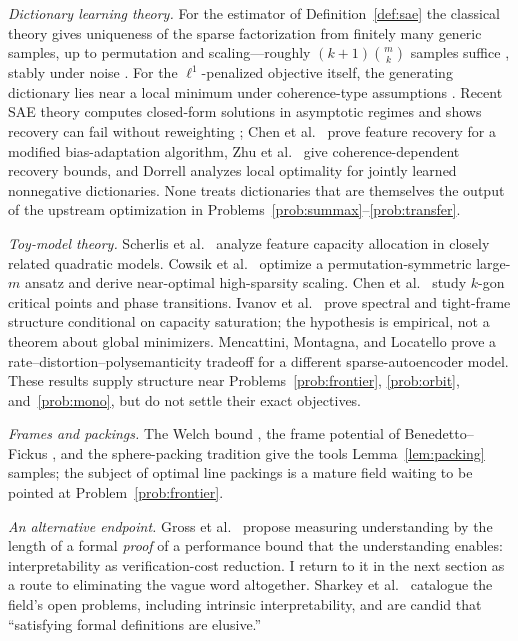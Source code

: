 \documentclass[11pt]{amsart}
\theoremstyle{plain}
\theoremstyle{definition}
\begin{document}
\emph{Dictionary learning theory.} For the estimator of Definition~\ref{def:sae} the classical theory gives uniqueness of the sparse factorization from finitely many generic samples, up to permutation and scaling---roughly $(k+1)\binom{m}{k}$ samples suffice \cite{aharon2006,hillar2015}, stably under noise \cite{garfinkle2019}. For the $\ell^1$-penalized objective itself, the generating dictionary lies near a local minimum under coherence-type assumptions \cite{gribonval2015}. Recent SAE theory computes closed-form solutions in asymptotic regimes and shows recovery can fail without reweighting \cite{cui2025}; Chen et al.~\cite{chen2025} prove feature recovery for a modified bias-adaptation algorithm, Zhu et al.~\cite{zhu2026} give coherence-dependent recovery bounds, and Dorrell \cite{dorrell2026} analyzes local optimality for jointly learned nonnegative dictionaries. None treats dictionaries that are themselves the output of the upstream optimization in Problems~\ref{prob:summax}--\ref{prob:transfer}.

\emph{Toy-model theory.} Scherlis et al.\ \cite{scherlis2022} analyze feature capacity allocation in closely related quadratic models. Cowsik et al.\ \cite{cowsik2024} optimize a permutation-symmetric large-$m$ ansatz and derive near-optimal high-sparsity scaling. Chen et al.\ \cite{chen2023} study $k$-gon critical points and phase transitions. Ivanov et al.\ \cite{ivanov2026} prove spectral and tight-frame structure conditional on capacity saturation; the hypothesis is empirical, not a theorem about global minimizers. Mencattini, Montagna, and Locatello \cite{mencattini2026} prove a rate--distortion--polysemanticity tradeoff for a different sparse-autoencoder model. These results supply structure near Problems~\ref{prob:frontier}, \ref{prob:orbit}, and~\ref{prob:mono}, but do not settle their exact objectives.

\emph{Frames and packings.} The Welch bound \cite{welch1974}, the frame potential of Benedetto--Fickus \cite{benedetto2003}, and the sphere-packing tradition give the tools Lemma~\ref{lem:packing} samples; the subject of optimal line packings is a mature field waiting to be pointed at Problem~\ref{prob:frontier}.

\emph{An alternative endpoint.} Gross et al.\ \cite{gross2024} propose measuring understanding by the length of a formal \emph{proof} of a performance bound that the understanding enables: interpretability as verification-cost reduction. I return to it in the next section as a route to eliminating the vague word altogether. Sharkey et al.\ \cite{sharkey2025} catalogue the field's open problems, including intrinsic interpretability, and are candid that ``satisfying formal definitions are elusive.''
\end{document}
